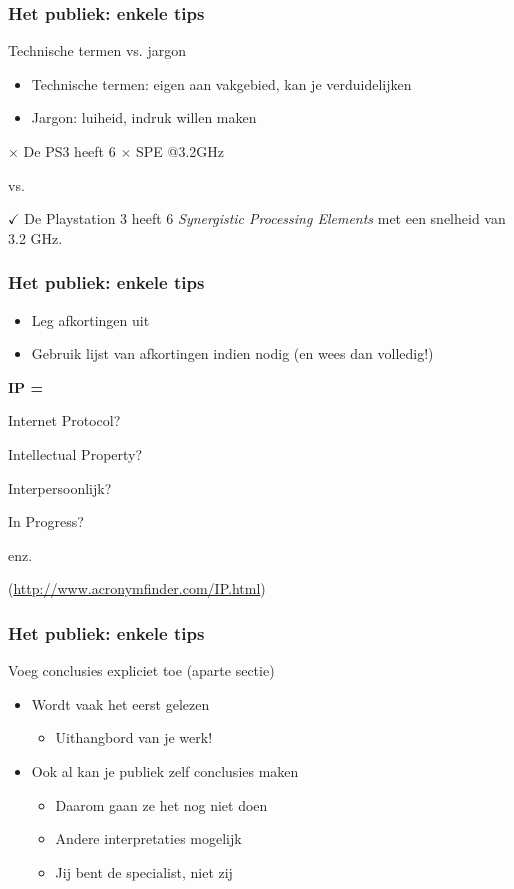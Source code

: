 \documentclass{beamer}
\begin{document}
\begin{frame}
  \frametitle{Het publiek: enkele tips}

  Technische termen vs. jargon

  \begin{itemize}
    \item Technische termen: eigen aan vakgebied, kan je verduidelijken
    \item Jargon: luiheid, indruk willen maken
  \end{itemize}

  \vfill

  \centering

  \textcolor{HoGentAccent2}{$\times$ De PS3 heeft 6 $\times$ SPE @3.2GHz}

  vs.

  \textcolor{HoGentAccent3}{$\checkmark$ De Playstation 3 heeft 6 \emph{Synergistic Processing Elements} met een snelheid van 3.2 GHz.}
\end{frame}

\begin{frame}
  \frametitle{Het publiek: enkele tips}

  \begin{itemize}
    \item Leg afkortingen uit
    \item Gebruik lijst van afkortingen indien nodig (en wees dan volledig!)
  \end{itemize}

  \vfill \centering

  \textbf{IP =}

  Internet Protocol?

  Intellectual Property?

  Interpersoonlijk?

  In Progress?

  enz.

  (\url{http://www.acronymfinder.com/IP.html})

\end{frame}

\begin{frame}
  \frametitle{Het publiek: enkele tips}

  Voeg conclusies expliciet toe (aparte sectie)

  \begin{itemize}
    \item Wordt vaak het eerst gelezen
      \begin{itemize}
        \item Uithangbord van je werk!
      \end{itemize}
    \item Ook al kan je publiek zelf conclusies maken
      \begin{itemize}
        \item Daarom gaan ze het nog niet doen
        \item Andere interpretaties mogelijk
        \item Jij bent de specialist, niet zij
      \end{itemize}
  \end{itemize}
\end{frame}
\end{document}
